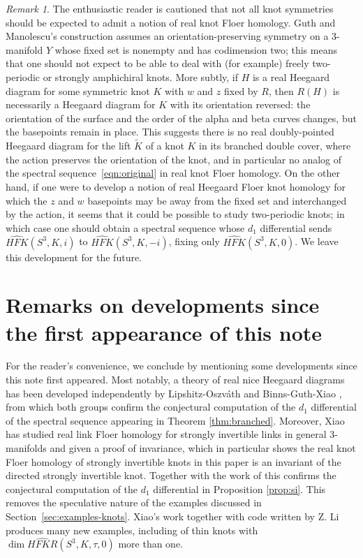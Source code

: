 \documentclass[11pt,reqno]{amsart}
\theoremstyle{definition}
\theoremstyle{remark}
\newtheorem{rem}[thm]{Remark}
\newcommand{\HFK}{\mathit{HFK}}
\newcommand\HFKhat{\widehat{\HFK}}
\newcommand \HFKR{ \widehat{\mathit{HFKR}}}
\numberwithin{equation}{section}
\begin{document}
\begin{rem} \label{rem:speculative} The enthusiastic reader is cautioned that not all knot symmetries should be expected to admit a notion of real knot Floer homology. Guth and Manolescu's construction assumes an orientation-preserving symmetry on a 3-manifold $Y$ whose fixed set is nonempty and has codimension two; this means that one should not expect to be able to deal with (for example) freely two-periodic or strongly amphichiral knots. More subtly, if $H$ is a real Heegaard diagram for some symmetric knot $K$ with $w$ and $z$ fixed by $R$, then $R(H)$ is necessarily a Heegaard diagram for $K$ with its orientation reversed: the orientation of the surface and the order of the alpha and beta curves changes, but the basepoints remain in place. This suggests there is no real doubly-pointed Heegaard diagram for the lift $\widetilde{K}$ of a knot $K$ in its branched double cover, where the action preserves the orientation of the knot, and in particular no analog of the spectral sequence~\eqref{eqn:original} in real knot Floer homology. On the other hand, if one were to develop a notion of real Heegaard Floer knot homology for which the $z$ and $w$ basepoints may be away from the fixed set and interchanged by the action, it seems that it could be possible to study two-periodic knots; in which case one should obtain a spectral sequence whose $d_1$ differential sends $\HFKhat(S^3,K,i)$ to $\HFKhat(S^3,K,-i)$, fixing only $\HFKhat(S^3,K,0)$. We leave this development for the future.
\end{rem}


\section{Remarks on developments since the first appearance of this note} \label{sec:since-then}

For the reader's convenience, we conclude by mentioning some developments since this note first appeared. Most notably, a theory of real nice Heegaard diagrams has been developed independently by Lipshitz-Oszv{\'a}th \cite{LO:real-bordered} and Binns-Guth-Xiao \cite{BGX:sutured}, from which both groups confirm the conjectural computation of the $d_1$ differential of the spectral sequence appearing in Theorem \ref{thm:branched}. Moreover, Xiao \cite{Xiao:real-link} has studied real link Floer homology for strongly invertible links in general 3-manifolds and given a proof of invariance, which in particular shows the real knot Floer homology of strongly invertible knots in this paper is an invariant of the directed strongly invertible knot. Together with the work of \cite{BGX:sutured} this confirms the conjectural computation of the $d_1$ differential in Proposition \ref{prop:si}. This removes the speculative nature of the examples discussed in Section~\ref{sec:examples-knots}. Xiao's work together with code written by Z. Li \cite{Li:real-grid} produces many new examples, including of thin knots with $\dim{\HFKR}(S^3,K, \tau, 0)$ more than one.
\end{document}
